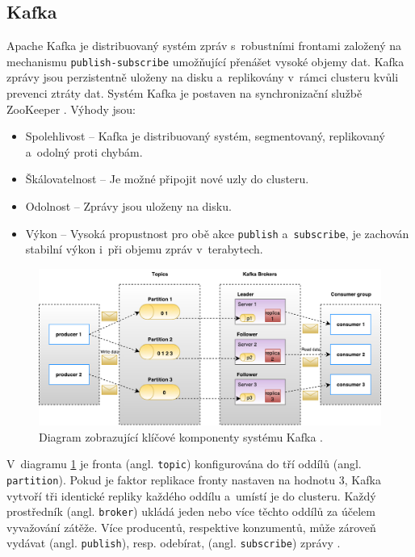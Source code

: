 \subsection{Kafka}
Apache Kafka je distribuovaný systém zpráv s~robustními frontami založený na mechanismu \texttt{publish-subscribe} umožňující přenášet vysoké objemy dat. Kafka zprávy jsou perzistentně uloženy na disku a~replikovány v~rámci clusteru kvůli prevenci ztráty dat. Systém Kafka je postaven na synchronizační službě ZooKeeper \cite{kafkaTutorialsPoint}. Výhody jsou:
\begin{itemize}
    \item Spolehlivost -- Kafka je distribuovaný systém, segmentovaný, replikovaný a~odolný proti chybám.
    
    \item Škálovatelnost -- Je možné připojit nové uzly do clusteru.
    
    \item Odolnost -- Zprávy jsou uloženy na disku.
    
    \item Výkon -- Vysoká propustnost pro obě akce \texttt{publish} a~\texttt{subscribe}, je zachován stabilní výkon i~při objemu zpráv v~terabytech.
\end{itemize}

\begin{figure}[!h]
  \centering
  \includegraphics[width=15cm]{template-fig/Kafka_architecture.pdf}
  \caption{Diagram zobrazující klíčové komponenty systému Kafka \cite{kafkaTutorialsPoint}.}
  \label{FIG_KafkaArchitecture}
\end{figure}

\noindent V~diagramu \ref{FIG_KafkaArchitecture} je fronta (angl. \texttt{topic}) konfigurována do tří oddílů (angl. \texttt{partition}). Pokud je faktor replikace fronty nastaven na hodnotu 3, Kafka vytvoří tři identické repliky každého oddílu a~umístí je do clusteru. Každý prostředník (angl. \texttt{broker}) ukládá jeden nebo více těchto oddílů za účelem vyvažování zátěže. Více producentů, respektive konzumentů, může zároveň vydávat (angl. \texttt{publish}), resp. odebírat, (angl. \texttt{subscribe}) zprávy \cite{kafkaTutorialsPoint}.

